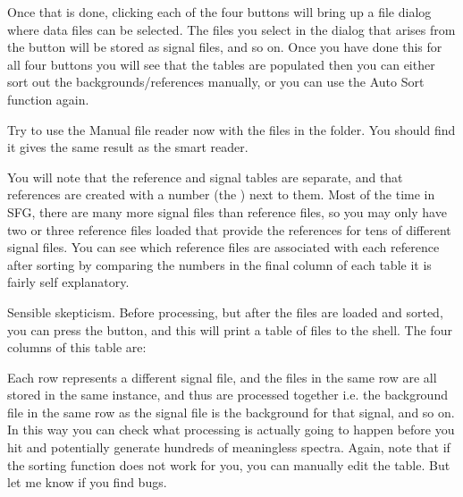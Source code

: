 \documentclass[a4paper,10pt,english]{sphinxmanual}
\begin{document}
\sphinxAtStartPar
Once that is done, clicking each of the four buttons will bring up a file dialog where data files can be selected. The files you select in the dialog that arises from the  button will be stored as signal files, and so on. Once you have done this for all four buttons you will see that the tables are populated \sphinxhyphen{} then you can either sort out the backgrounds/references manually, or you can use the Auto Sort function again.

\sphinxAtStartPar
Try to use the Manual file reader now with the files in the  folder. You should find it gives the same result as the smart reader.

\sphinxAtStartPar
You will note that the reference and signal tables are separate, and that references are created with a number (the ) next to them. Most of the time in SFG, there are many more signal files than reference files, so you may only have two or three reference files loaded that provide the references for tens of different signal files. You can see which reference files are associated with each reference after sorting by comparing the numbers in the final column of each table \sphinxhyphen{} it is fairly self explanatory.

\sphinxAtStartPar
Sensible skepticism. Before processing, but after the files are loaded and sorted, you can press the  button, and this will print a table of files to the shell. The four columns of this table are:

\begin{sphinxVerbatim}[commandchars=\\\{\}]
\PYG{p}{[}   \PYG{p}{]}
\end{sphinxVerbatim}

\sphinxAtStartPar
Each row represents a different signal file, and the files in the same row are all stored in the same  instance, and thus are processed together \sphinxhyphen{} i.e. the background file in the same row as the signal file is the background for that signal, and so on. In this way you can check what processing is actually going to happen before you hit  and potentially generate hundreds of meaningless spectra. Again, note that if the sorting function does not work for you, you can manually edit the table. But let me know if you find bugs.
\end{document}
